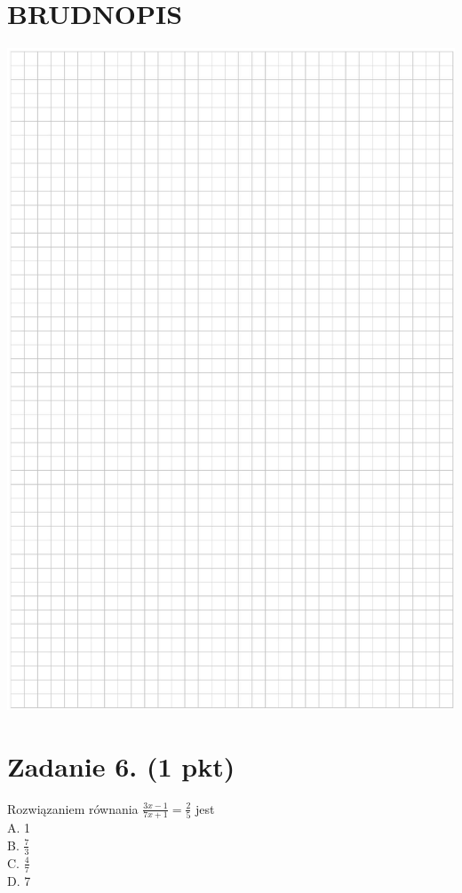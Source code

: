 \documentclass[10pt]{article}
\begin{document}
\section*{BRUDNOPIS}
\begin{center}
\includegraphics[max width=\textwidth]{2024_11_21_caf6b2e64dd65c9b24eeg-03}
\end{center}

\section*{Zadanie 6. (1 pkt)}
Rozwiązaniem równania \(\frac{3 x-1}{7 x+1}=\frac{2}{5}\) jest\\
A. 1\\
B. \(\frac{7}{3}\)\\
C. \(\frac{4}{7}\)\\
D. 7
\end{document}
